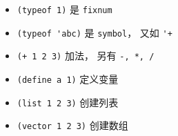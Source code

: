 
\begin{itemize}
\item \verb`(typeof 1)` 是 \verb`fixnum`
\item \verb`(typeof 'abc)` 是 \verb`symbol`， 又如 \verb`'+`
\item \verb`(+ 1 2 3)` 加法， 另有 \verb`-, *, /`
\item \verb`(define a 1)` 定义变量
\item \verb`(list 1 2 3)` 创建列表
\item \verb`(vector 1 2 3)` 创建数组
\end{itemize}

